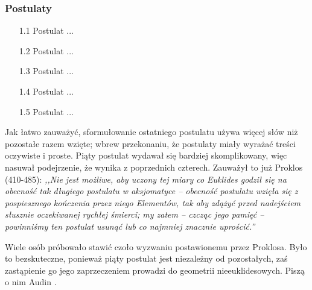 \subsubsection{Postulaty}	
\begin{enumerate}	
    \item [1.1] Postulat ... %
    \item [1.2] Postulat ... %
    \item [1.3] Postulat ... %
    \item [1.4] Postulat ... %
    \item [1.5] Postulat ... %
\end{enumerate}	
	
Jak łatwo zauważyć, sformułowanie ostatniego postulatu używa więcej słów niż pozostałe razem wzięte; wbrew przekonaniu, że postulaty miały wyrażać treści oczywiste i proste.	
Piąty postulat wydawał się bardziej skomplikowany, więc nasuwał podejrzenie, że wynika z poprzednich czterech.	
Zauważył to już Proklos (410-485): \emph{,,Nie jest możliwe, aby uczony tej miary co Euklides godził się na obecność tak długiego postulatu w aksjomatyce -- obecność postulatu wzięła się z pospiesznego kończenia przez niego Elementów, tak aby zdążyć przed nadejściem słusznie oczekiwanej rychłej śmierci; my zatem -- czcząc jego pamięć -- powinniśmy ten postulat usunąć lub co najmniej znacznie uprościć.''}	
	
Wiele osób próbowało stawić czoło wyzwaniu postawionemu przez Proklosa.	
Było to bezskuteczne, ponieważ piąty postulat jest niezależny od pozostałych, zaś zastąpienie go jego zaprzeczeniem prowadzi do geometrii nieeuklidesowych.	
Piszą o nim Audin \cite[s. 13]{audin_2003}.
	
